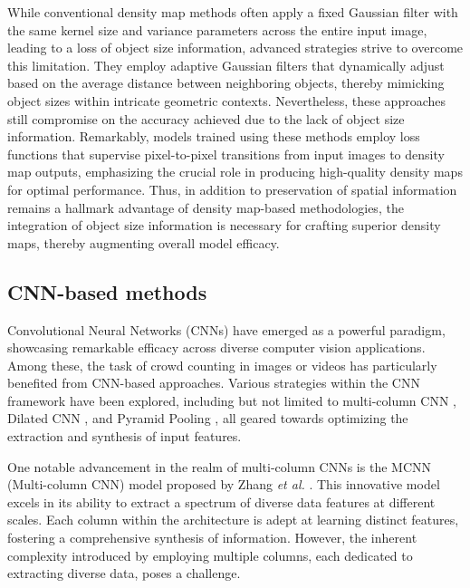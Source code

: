 \documentclass[journal]{IEEEtran}
\begin{document}
While conventional density map methods \cite{firstdensity, shrimp_density_1} often apply a fixed Gaussian filter with the same kernel size and variance parameters across the entire input image, leading to a loss of object size information, advanced strategies strive to overcome this limitation. They employ adaptive Gaussian filters \cite{mcnn, shrimp_density_2, sanet, csrnet, cffnet, can, tednet, sfanet, sganet} that dynamically adjust based on the average distance between neighboring objects, thereby mimicking object sizes within intricate geometric contexts. Nevertheless, these approaches still compromise on the accuracy achieved due to the lack of object size information. Remarkably, models trained using these methods employ loss functions that supervise pixel-to-pixel transitions from input images to density map outputs, emphasizing the crucial role in producing high-quality density maps for optimal performance. Thus, in addition to preservation of spatial information remains a hallmark advantage of density map-based methodologies, the integration of object size information is necessary for crafting superior density maps, thereby augmenting overall model efficacy.
\subsection{CNN-based methods}
Convolutional Neural Networks (CNNs) have emerged as a powerful paradigm, showcasing remarkable efficacy across diverse computer vision applications. Among these, the task of crowd counting in images or videos has particularly benefited from CNN-based approaches. Various strategies within the CNN framework have been explored, including but not limited to multi-column CNN \cite{mcnn, sanet,shrimp_density_2, tednet}, Dilated CNN \cite{csrnet, dadnet, adaptivedilated, spatiotemporaldilated}, and Pyramid Pooling \cite{scalepyramid, atrouspyramid, fpanet}, all geared towards optimizing the extraction and synthesis of input features.

One notable advancement in the realm of multi-column CNNs is the MCNN (Multi-column CNN) model proposed by Zhang \textit{et al.} \cite{mcnn}. This innovative model excels in its ability to extract a spectrum of diverse data features at different scales. Each column within the architecture is adept at learning distinct features, fostering a comprehensive synthesis of information. However, the inherent complexity introduced by employing multiple columns, each dedicated to extracting diverse data, poses a challenge.
\end{document}
